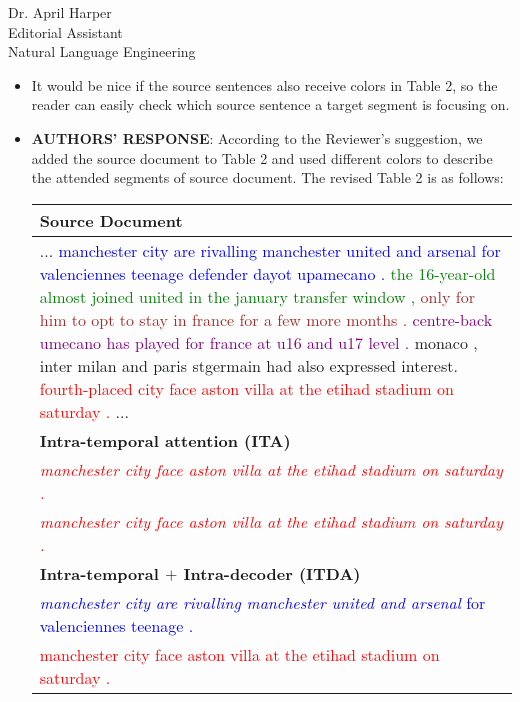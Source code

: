\documentclass[11pt]{letter} %
\theoremstyle{definition}
\begin{document}
\begin{letter}{Dr. April Harper \\
            Editorial Assistant \\
			Natural Language Engineering}
\begin{enumerate}
\begin{itemize}
       
                \item It would be nice if the source sentences also receive colors in Table 2, so the reader can easily check which source sentence a target segment is focusing on.
				\item[] \textbf{AUTHORS' RESPONSE}: 
                According to the Reviewer's suggestion, we added the source document to Table 2 and used different colors to describe the attended segments of source document. The revised Table 2 is as follows:
                \begin{center}
                	\small
                	\begin{tabular}{|p{14.3cm}|}
                		\hline \bf Source Document \\
                		\hline ... \textcolor{blue}{manchester city are rivalling manchester united and arsenal for valenciennes teenage defender dayot upamecano .} \textcolor{green}{the 16-year-old almost joined united in the january transfer window ,} \textcolor{brown}{only for him to opt to stay in france for a few more months .}  \textcolor{purple}{centre-back umecano has played for france at u16 and u17 level .} 
                		monaco , inter milan and paris stgermain had also expressed interest. \textcolor{red}{fourth-placed city face aston villa at the etihad stadium on saturday .} ...\\
                		\hline \bf Intra-temporal attention (ITA) \\
                		\hline \textcolor{red}{\textit{manchester city face aston villa at the etihad stadium on saturday .}} \\
                		\textcolor{red}{\textit{manchester city face aston villa at the etihad stadium on saturday .}} \\
                		\hline \bf Intra-temporal $+$ Intra-decoder (ITDA) \\
                		\hline \textcolor{blue}{\textit{manchester city are rivalling manchester united and arsenal }for valenciennes teenage .}\\
                		\textcolor{red}{manchester city face aston villa at the etihad stadium on saturday .} \\

\end{tabular}
\end{center}
\end{itemize}
\end{enumerate}
\end{letter}
\end{document}
